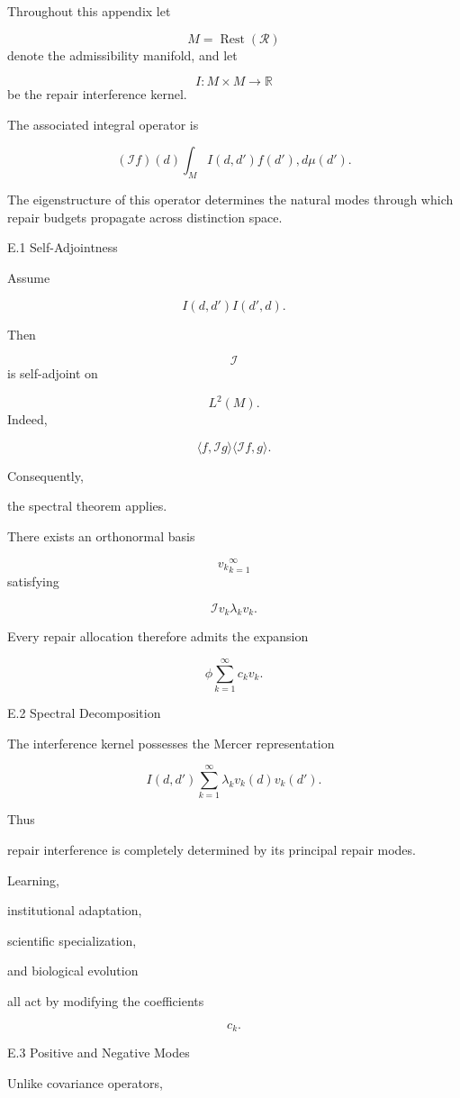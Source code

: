 \documentclass[12pt,oneside]{article}
\theoremstyle{plain}
\theoremstyle{definition}
\theoremstyle{remark}
\DeclareMathOperator{\Rest}{Rest}
\begin{document}
Throughout this appendix let

\[
M=\Rest(\mathcal R)
\]
denote the admissibility manifold, and let

\[
I:M\times M\rightarrow\mathbb R
\]
be the repair interference kernel.

The associated integral operator is

\[
(\mathcal I f)(d)
\int_M
I(d,d')
f(d')
,d\mu(d').
\]

The eigenstructure of this operator determines the natural modes through which repair budgets propagate across distinction space.


E.1 Self-Adjointness

Assume

\[
I(d,d')
I(d',d).
\]

Then

\[
\mathcal I
\]
is self-adjoint on

\[
L^2(M).
\]
Indeed,

\[
\langle
f,
\mathcal Ig
\rangle
\langle
\mathcal If,
g
\rangle.
\]

Consequently,

the spectral theorem applies.

There exists an orthonormal basis

\[
{
v_k
}_{k=1}^{\infty}
\]
satisfying

\[
\mathcal Iv_k
\lambda_kv_k.
\]

Every repair allocation therefore admits the expansion

\[
\phi
\sum_{k=1}^{\infty}
c_kv_k.
\]


E.2 Spectral Decomposition

The interference kernel possesses the Mercer representation

\[
I(d,d')
\sum_{k=1}^{\infty}
\lambda_k
v_k(d)
v_k(d').
\]

Thus

repair interference is completely determined by its principal repair modes.

Learning,

institutional adaptation,

scientific specialization,

and biological evolution

all act by modifying the coefficients

\[
c_k.
\]

E.3 Positive and Negative Modes

Unlike covariance operators,
\end{document}

